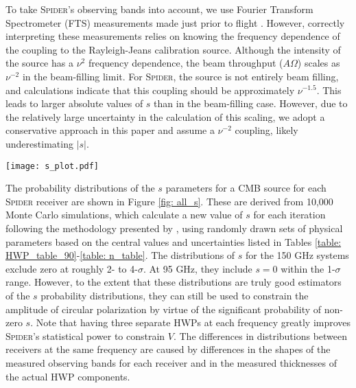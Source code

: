 \documentclass[twocolumn]{aastex61}
\begin{document}
To take \textsc{Spider}'s observing bands into account, we use Fourier Transform Spectrometer (FTS) measurements made just prior to flight \citep{Jon_thesis}.  However, correctly interpreting these measurements relies on knowing the frequency dependence of the coupling to the Rayleigh-Jeans calibration source.  Although the intensity of the source has a $\nu^2$ frequency dependence, the beam throughput ($A\Omega$) scales as $\nu^{-2}$ in the beam-filling limit.  For \textsc{Spider}, the source is not entirely beam filling, and calculations indicate that this coupling should be approximately $\nu^{-1.5}$.  This leads to larger absolute values of $s$ than in the beam-filling case.  However, due to the relatively large uncertainty in the calculation of this scaling, we adopt a conservative approach in this paper and assume a $\nu^{-2}$ coupling, likely underestimating $|s|$.  


\begin{figure*}
\begin{centering}
\texttt{[image: s\_plot.pdf]}
\par
\end{centering}

\caption{Probability distributions of the $s$ parameter for each \textsc{Spider} receiver.  Each distribution is based on 10,000 Monte Carlo simulations that include a CMB source spectrum, the measured observing band, and the physical properties of the individual HWP.  The 150 GHz HWPs have larger absolute values of $s$ than the 95 GHz HWPs primarily because the sapphire thicknesses are not as well matched to the observing bands.  Although  some  of  the  distributions include $s=0$ with a substantial probability, having three different HWPs at each frequency greatly improves \textsc{Spider}'s statistical power to constrain $V$.}
\label{fig: all_s}
\end{figure*}

The probability distributions of the $s$ parameters for a CMB source for each \textsc{Spider} receiver are shown in Figure \ref{fig: all_s}. These are derived from 10,000 Monte Carlo simulations, which calculate a new value of $s$ for each iteration following the methodology presented by \citet{bryan2010modeling}, using randomly drawn sets of physical parameters based on the central values and uncertainties listed in Tables \ref{table: HWP_table_90}-\ref{table: n_table}.  The distributions of $s$ for the 150 GHz systems exclude zero at roughly 2- to 4-$\sigma$.  At 95 GHz, they include $s=0$ within the 1-$\sigma$ range.  However, to the extent that these distributions are truly good estimators of the $s$ probability distributions, they can still be used to constrain the amplitude of circular polarization by virtue of the significant probability of non-zero $s$.  Note that having three separate HWPs at each frequency greatly improves \textsc{Spider}'s statistical power to constrain $V$.  The differences in distributions between receivers at the same frequency are caused by differences in the shapes of the measured observing bands for each receiver and in the measured thicknesses of the actual HWP components.
\end{document}
